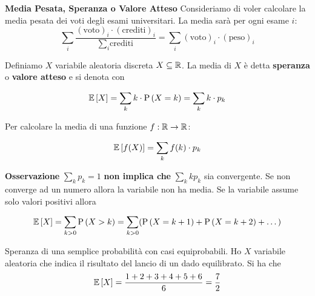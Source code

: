 \begin{defn}
    \textbf{Media Pesata, Speranza o Valore Atteso}
    Consideriamo di voler calcolare la media pesata dei voti degli esami universitari. La media sarà per ogni esame $ i $:
    \begin{equation*}
    \sum_{i} \dfrac{(\text{voto})_i \cdot (\text{crediti})_i }{\sum_{i} \text{crediti}} = \sum_{i} (\text{voto})_i \cdot (\text{peso})_i
    \end{equation*}
    
    Definiamo $ X $ variabile aleatoria discreta $ X \subseteq \mathbb{R} $. La media di $ X $ è detta \textbf{speranza} o \textbf{valore atteso} e si denota con
    
    \begin{equation*}
    \mathbb{E}\left[X\right] = \sum_{k} k \cdot \text{P}\left(X = k\right) = \sum_{k} k \cdot p_k
    \end{equation*}
    
    Per calcolare la media di una funzione $ f : \mathbb{R} \to \mathbb{R} $:
    
    \begin{equation*}
    \mathbb{E}\left[f(X)\right] = \sum_{k} f(k) \cdot p_k
    \end{equation*}
    
    \textbf{Osservazione} $\sum_{k} p_k = 1 $ \textbf{non implica che} $ \sum_{k} k p_k $ sia convergente. Se non converge ad un numero allora la variabile non ha media. Se la variabile assume solo valori positivi allora
    
    \begin{equation*}
    \mathbb{E}\left[X\right] = \sum_{k>0} \text{P}\left(X > k\right) = \sum_{k>0} (\text{P}\left(X = k+1\right) + \text{P}\left(X = k+2\right) + \dots)
    \end{equation*}
    
\end{defn}

\begin{exmp}
    Speranza di una semplice probabilità con casi equiprobabili. Ho \(X\) variabile aleatoria che indica il risultato del lancio di un dado equilibrato. Si ha che
    \begin{equation*}
        \mathbb{E}\left[X\right] = \dfrac{1 + 2 + 3 + 4 + 5 + 6}{6} = \dfrac{7}{2}
    \end{equation*}
\end{exmp}

